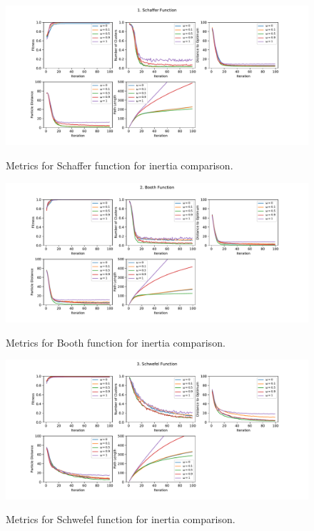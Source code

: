 \documentclass[12pt]{article}
\begin{document}
\begin{figure}
	\centering
	\includegraphics[width=1\textwidth]{figures/ex3/ex3-1.pdf}
	\label{fig:ex3-1}
	\caption{Metrics for Schaffer function for inertia comparison.}
\end{figure}

\begin{figure}
	\centering
	\includegraphics[width=1\textwidth]{figures/ex3/ex3-2.pdf}
	\label{fig:ex3-2}
	\caption{Metrics for Booth function for inertia comparison.}
\end{figure}

\begin{figure}
	\centering
	\includegraphics[width=1\textwidth]{figures/ex3/ex3-3.pdf}
	\label{fig:ex3-3}
	\caption{Metrics for Schwefel function for inertia comparison.}
\end{figure}
\end{document}
